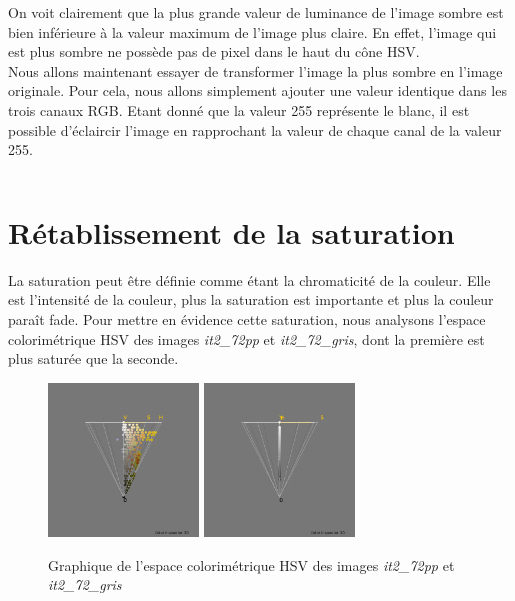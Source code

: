 \documentclass[a4paper,10pt]{article}
\begin{document}
On voit clairement que la plus grande valeur de luminance de l'image sombre est bien inférieure
à la valeur maximum de l'image plus claire. En effet, l'image qui est plus sombre ne possède pas de pixel dans le haut du cône HSV.\\

Nous allons maintenant essayer de transformer l'image la plus sombre en l'image originale. Pour cela,
nous allons simplement ajouter une valeur identique dans les trois canaux RGB. Etant donné que la valeur 255
représente le blanc, il est possible d'éclaircir l'image en rapprochant la valeur de chaque canal de la valeur 255.

\begin{tabular}{|c|c|c|}
 
\end{tabular}


\section{Rétablissement de la saturation}
La saturation peut être définie comme étant la chromaticité de la couleur. Elle est l'intensité de la couleur, plus
la saturation est importante et plus la couleur paraît fade. Pour mettre en évidence cette saturation, nous analysons
l'espace colorimétrique HSV des images \textit{it2\_72pp} et \textit{it2\_72\_gris}, dont la première est plus saturée
que la seconde.\\

\begin{figure}[!h]
 \begin{center}
 \includegraphics[width=4cm]{resultat/saturation1.png}
 \includegraphics[width=4cm]{resultat/saturation2.png}
 \caption{Graphique de l'espace colorimétrique HSV des images \textit{it2\_72pp} et \textit{it2\_72\_gris}}
 \end{center}
\end{figure}
\end{document}
